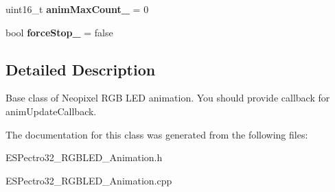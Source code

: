 \begin{DoxyCompactItemize}
\item 
\hypertarget{classESPectro32__RGBLED__Animation_a519bddb3df7113d2014aaed34058fd29}{uint16\-\_\-t {\bfseries anim\-Max\-Count\-\_\-} = 0}\label{classESPectro32__RGBLED__Animation_a519bddb3df7113d2014aaed34058fd29}

\item 
\hypertarget{classESPectro32__RGBLED__Animation_a749e19362a0b3b359bd6a8681fee809e}{bool {\bfseries force\-Stop\-\_\-} = false}\label{classESPectro32__RGBLED__Animation_a749e19362a0b3b359bd6a8681fee809e}

\end{DoxyCompactItemize}


\subsection{Detailed Description}
Base class of Neopixel R\-G\-B L\-E\-D animation. You should provide callback for anim\-Update\-Callback. 

The documentation for this class was generated from the following files\-:\begin{DoxyCompactItemize}
\item 
E\-S\-Pectro32\-\_\-\-R\-G\-B\-L\-E\-D\-\_\-\-Animation.\-h\item 
E\-S\-Pectro32\-\_\-\-R\-G\-B\-L\-E\-D\-\_\-\-Animation.\-cpp\end{DoxyCompactItemize}
